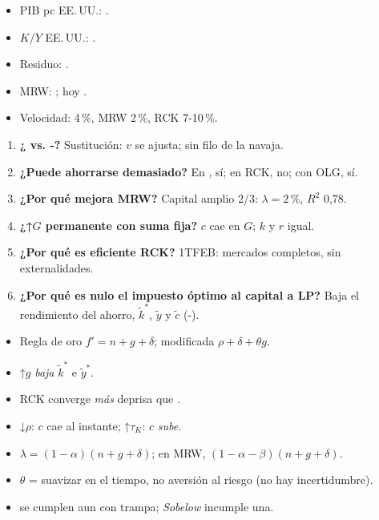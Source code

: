 \documentclass{article}
\begin{document}
\begin{columnas}
\anexorepaso
{}
\begin{itemize}
\item PIB pc EE.\,UU.: .
\item $K/Y$ EE.\,UU.: .
\item Residuo: .
\item MRW: ; hoy .
\item Velocidad:  4\,\%, MRW 2\,\%, RCK 7-10\,\%.
\end{itemize}
\begin{enumerate}
\item \textbf{¿ vs. -?} Sustitución: $v$ se ajusta; sin filo de la navaja.
\item \textbf{¿Puede ahorrarse demasiado?} En , sí; en RCK, no; con OLG, sí.
\item \textbf{¿Por qué mejora MRW?} Capital amplio 2/3: $\lambda=2$\,\%, $R^2$ 0,78.
\item \textbf{¿↑$G$ permanente con suma fija?} $c$ cae en $G$; $k$ y $r$ igual.
\item \textbf{¿Por qué es eficiente RCK?} 1TFEB: mercados completos, sin externalidades.
\item \textbf{¿Por qué es nulo el impuesto óptimo al capital a LP?} Baja el rendimiento del ahorro, $\tilde k^*$, $\tilde y$ y $\tilde c$ (-).
\end{enumerate}
\begin{trampa}
\begin{itemize}
\item Regla de oro $f'=n+g+\delta$; modificada $\rho+\delta+\theta g$.
\item ↑$g$ \emph{baja} $\tilde k^*$ e $\tilde y^*$.
\item RCK converge \emph{más} deprisa que .
\item ↓$\rho$: $c$ cae al instante; ↑$\tau_K$: $c$ \emph{sube}.
\item $\lambda=(1-\alpha)(n+g+\delta)$; en MRW, $(1-\alpha-\beta)(n+g+\delta)$.
\item $\theta$ = suavizar en el tiempo, no aversión al riesgo (no hay incertidumbre).
\item {} se cumplen aun con trampa; \emph{Sobelow} incumple una.
\end{itemize}
\end{trampa}

\end{columnas}
\end{document}
